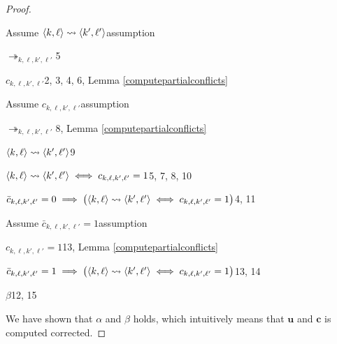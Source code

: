 \begin{proof}
\begin{enumerate}
			\item Assume $c_{k,\ell,k',\ell'}$\hfill assumption
			\item $\langle{k},{\ell}\rangle\rightsquigarrow\langle{k'},{\ell'}\rangle\iff c_{k,\ell,k',\ell'}=1$\hfill 5, 7, 8, 10
		\end{level}
		\item $\bar{c}_{k,\ell,k',\ell'}=0\implies\big(\langle{k},{\ell}\rangle\rightsquigarrow\langle{k'},{\ell'}\rangle\iff c_{k,\ell,k',\ell'}=1\big)$\hfill 4, 11
		\item Assume $\bar{c}_{k,\ell,k',\ell'}=1$\hfill assumption
		\begin{level}
			\item $c_{k,\ell,k',\ell'}=1$\hfill 13, Lemma \ref{computepartialconflicts}
		\end{level}
		\item $\bar{c}_{k,\ell,k',\ell'}=1\implies\big(\langle{k},{\ell}\rangle\rightsquigarrow\langle{k'},{\ell'}\rangle\iff c_{k,\ell,k',\ell'}=1\big)$\hfill 13, 14
		\item $\beta$\hfill 12, 15
	\end{enumerate}

	We have shown that $\alpha$ and $\beta$ holds, which intuitively means that $\mathbf{u}$ and $\mathbf{c}$ is computed corrected.
\end{proof}

